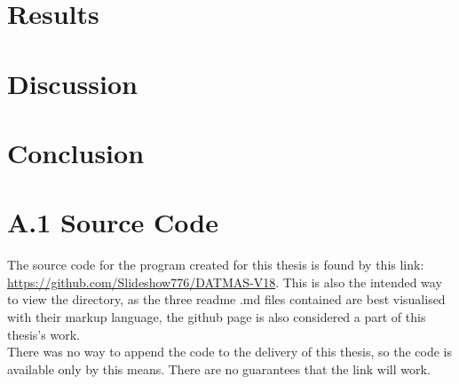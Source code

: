 \documentclass[12pt, twoside]{report}
\begin{document}
\chapter{Results}


\chapter{Discussion}


\chapter{Conclusion}


\appendix
\chapter{A.1 Source Code}
The source code for the program created for this thesis is found by this link: \url{https://github.com/Slideshow776/DATMAS-V18}. This is also the intended way to view the directory, as the three readme .md files contained are best visualised with their markup language, the github page is also considered a part of this thesis's work. \\
There was no way to append the code to the delivery of this thesis, so the code is available only by this means. There are no guarantees that the link will work.



\end{document}
